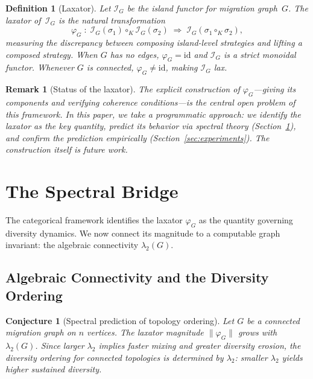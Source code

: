 \documentclass[submission,copyright,creativecommons]{eptcs}
\newtheorem{conjecture}{Conjecture}
\newtheorem{definition}{Definition}
\newtheorem{remark}{Remark}
\begin{document}
\begin{definition}[Laxator]
\label{def:laxator}
Let $\mathcal{I}_G$ be the island functor for migration graph~$G$.
The \emph{laxator} of~$\mathcal{I}_G$ is the natural transformation
\[
  \varphi_G \;:\; \mathcal{I}_G(\sigma_1) \circ_K \mathcal{I}_G(\sigma_2)
  \;\Rightarrow\; \mathcal{I}_G(\sigma_1 \circ_K \sigma_2),
\]
measuring the discrepancy between composing island-level strategies
and lifting a composed strategy. When $G$ has no edges,
$\varphi_G = \mathrm{id}$ and $\mathcal{I}_G$ is a strict monoidal
functor. Whenever $G$ is connected, $\varphi_G \neq \mathrm{id}$,
making $\mathcal{I}_G$ lax.
\end{definition}

\begin{remark}[Status of the laxator]
\label{rem:laxator-status}
The explicit construction of $\varphi_G$---giving its components and
verifying coherence conditions---is the central open problem of this
framework. In this paper, we take a programmatic approach: we identify
the laxator as the key quantity, predict its behavior via spectral
theory (Section~\ref{sec:spectral}), and confirm the prediction
empirically (Section~\ref{sec:experiments}). The construction itself
is future work.
\end{remark}

\section{The Spectral Bridge}
\label{sec:spectral}

The categorical framework identifies the laxator $\varphi_G$ as the
quantity governing diversity dynamics. We now connect its magnitude
to a computable graph invariant: the algebraic connectivity
$\lambda_2(G)$.

\subsection{Algebraic Connectivity and the Diversity Ordering}

\begin{conjecture}[Spectral prediction of topology ordering]
\label{prop:spectral}
Let $G$ be a connected migration graph on $n$ vertices.
The laxator magnitude $\|\varphi_G\|$ grows with
$\lambda_2(G)$. Since larger $\lambda_2$ implies faster mixing
and greater diversity erosion, the diversity ordering for
connected topologies is determined by $\lambda_2$: smaller
$\lambda_2$ yields higher sustained diversity.
\end{conjecture}
\end{document}
